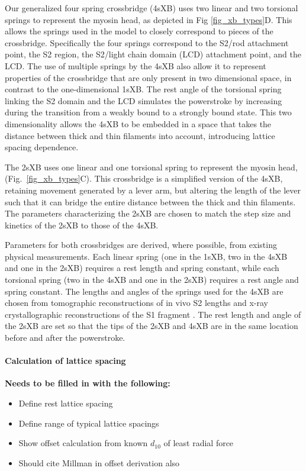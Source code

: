 \documentclass[]{article}
\begin{document}
Our generalized four spring crossbridge (4sXB) uses two linear and two torsional springs to represent the myosin head, as depicted in Fig \ref{fig_xb_types}D.
This allows the springs used in the model to closely correspond to pieces of the crossbridge.
Specifically the four springs correspond to the S2/rod attachment point, the S2 region, the S2/light chain domain (LCD) attachment point, and the LCD.
The use of multiple springs by the 4sXB also allow it to represent properties of the crossbridge that are only present in two dimensional space, in contrast to the one-dimensional 1sXB. 
The rest angle of the torsional spring linking the S2 domain and the LCD simulates the powerstroke by increasing during the transition from a weakly bound to a strongly bound state.
This two dimensionality allows the 4sXB to be embedded in a space that takes the distance between thick and thin filaments into account, introducing lattice spacing dependence.

The 2sXB uses one linear and one torsional spring to represent the myosin head, (Fig.~\ref{fig_xb_types}C).
This crossbridge is a simplified version of the 4sXB, retaining movement generated by a lever arm, but altering the length of the lever such that it can bridge the entire distance between the thick and thin filaments.
The parameters characterizing the 2sXB are chosen to match the step size and kinetics of the 2sXB to those of the 4sXB.

Parameters for both crossbridges are derived, where possible, from existing physical measurements.
Each linear spring (one in the 1sXB, two in the 4sXB and one in the 2sXB) requires a rest length and spring constant, while each torsional spring (two in the 4sXB and one in the 2sXB) requires a rest angle and spring constant.
The lengths and angles of the springs used for the 4sXB are chosen from tomographic reconstructions of in vivo S2 lengths and x-ray crystallographic reconstructions of the S1 fragment \citep{Taylor1999, Rayment1993}.
The rest length and angle of the 2sXB are set so that the tips of the 2sXB and 4sXB are in the same location before and after the powerstroke.



\paragraph{Calculation of lattice spacing} %
\textbf{Needs to be filled in with the following:}
\begin{itemize}
 \item Define rest lattice spacing
 \item Define range of typical lattice spacings
 \item Show offset calculation from known $d_{10}$ of least radial force
 \item Should cite Millman in offset derivation also
\end{itemize}
\end{document}
